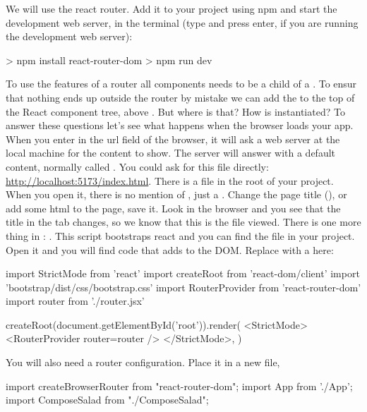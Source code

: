 \documentclass[fleqn, article, a4paper]{memoir}
\begin{document}
\begin{Assignments}
\item We will use the react router. Add it to your project using npm and start the development web server, in the terminal (type  and press enter, if you are running the development web server):
\begin{Code}
> npm install react-router-dom
> npm run dev
\end{Code}

\item To use the features of a router all components needs to be a child of a . To ensur that nothing ends up outside the router by mistake we can add the  to the top of the React component tree, above . But where is that? How is  instantiated? To answer these questions let's see what happens when the browser loads your app. When you enter  in the url field of the browser, it will ask a web server at the local machine for the content to show. The server will answer with a default content, normally called . You could ask for this file directly: \url{http://localhost:5173/index.html}. There is a  file in the root of your project. When you open it, there is no mention of , just a . Change the page title (), or add some html to the page, save it. Look in the browser and you see that the title in the tab changes, so we know that this is the file viewed. There is one more thing in : . This script bootstraps react and you can find the file in your project. Open it and you will find code that adds  to the DOM. Replace  with a  here:
\begin{Code}
import { StrictMode } from 'react'
import { createRoot } from 'react-dom/client'
import 'bootstrap/dist/css/bootstrap.css'
import { RouterProvider } from 'react-router-dom'
import router from './router.jsx'

createRoot(document.getElementById('root')).render(
  <StrictMode>
    <RouterProvider router={router} />
  </StrictMode>,
)
\end{Code}
\noindent You will also need a router configuration. Place it in a new file, 
\begin{Code}
import { createBrowserRouter } from "react-router-dom";
import App from './App';
import ComposeSalad from "./ComposeSalad";


\end{Code}
\end{Assignments}
\end{document}
